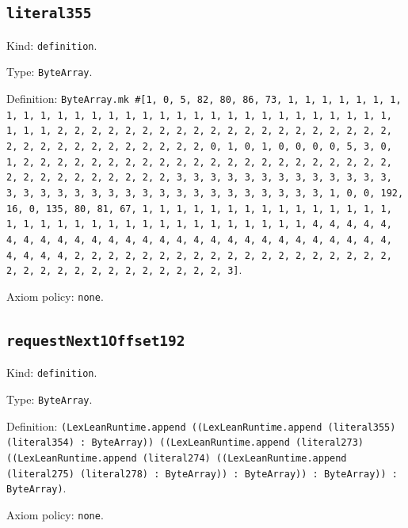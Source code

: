 \documentclass[11pt]{article}
\begin{document}
\subsection*{\texttt{literal355}}
\noindent Kind: \texttt{definition}.\par
\noindent Type: \texttt{ByteArray}.\par
\noindent Definition: \texttt{ByteArray.mk \#[1, 0, 5, 82, 80, 86, 73, 1, 1, 1, 1, 1, 1, 1, 1, 1, 1, 1, 1, 1, 1, 1, 1, 1, 1, 1, 1, 1, 1, 1, 1, 1, 1, 1, 1, 1, 1, 1, 1, 1, 2, 2, 2, 2, 2, 2, 2, 2, 2, 2, 2, 2, 2, 2, 2, 2, 2, 2, 2, 2, 2, 2, 2, 2, 2, 2, 2, 2, 2, 2, 2, 2, 0, 1, 0, 1, 0, 0, 0, 0, 5, 3, 0, 1, 2, 2, 2, 2, 2, 2, 2, 2, 2, 2, 2, 2, 2, 2, 2, 2, 2, 2, 2, 2, 2, 2, 2, 2, 2, 2, 2, 2, 2, 2, 2, 2, 3, 3, 3, 3, 3, 3, 3, 3, 3, 3, 3, 3, 3, 3, 3, 3, 3, 3, 3, 3, 3, 3, 3, 3, 3, 3, 3, 3, 3, 3, 3, 3, 1, 0, 0, 192, 16, 0, 135, 80, 81, 67, 1, 1, 1, 1, 1, 1, 1, 1, 1, 1, 1, 1, 1, 1, 1, 1, 1, 1, 1, 1, 1, 1, 1, 1, 1, 1, 1, 1, 1, 1, 1, 1, 1, 4, 4, 4, 4, 4, 4, 4, 4, 4, 4, 4, 4, 4, 4, 4, 4, 4, 4, 4, 4, 4, 4, 4, 4, 4, 4, 4, 4, 4, 4, 4, 4, 2, 2, 2, 2, 2, 2, 2, 2, 2, 2, 2, 2, 2, 2, 2, 2, 2, 2, 2, 2, 2, 2, 2, 2, 2, 2, 2, 2, 2, 2, 2, 2, 3]}.\par
\noindent Axiom policy: \texttt{none}.\par
\subsection*{\texttt{requestNext1Offset192}}
\noindent Kind: \texttt{definition}.\par
\noindent Type: \texttt{ByteArray}.\par
\noindent Definition: \texttt{(LexLeanRuntime.append ((LexLeanRuntime.append (literal355) (literal354) : ByteArray)) ((LexLeanRuntime.append (literal273) ((LexLeanRuntime.append (literal274) ((LexLeanRuntime.append (literal275) (literal278) : ByteArray)) : ByteArray)) : ByteArray)) : ByteArray)}.\par
\noindent Axiom policy: \texttt{none}.\par
\end{document}
